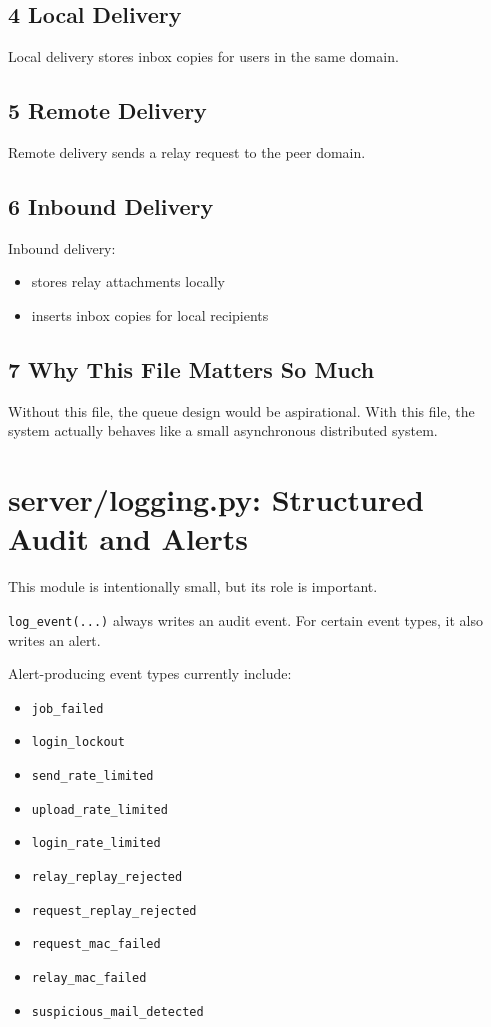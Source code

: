 \documentclass[11pt,a4paper]{article}
\begin{document}
\subsection{4 Local Delivery}

Local delivery stores inbox copies for users in the same domain.

\subsection{5 Remote Delivery}

Remote delivery sends a relay request to the peer domain.

\subsection{6 Inbound Delivery}

Inbound delivery:

\begin{itemize}
\item stores relay attachments locally
\item inserts inbox copies for local recipients
\end{itemize}

\subsection{7 Why This File Matters So Much}

Without this file, the queue design would be aspirational. With this file, the system actually behaves like a small asynchronous distributed system.


\section{server/logging.py: Structured Audit and Alerts}

This module is intentionally small, but its role is important.

\nolinkurl{log_event(...)} always writes an audit event. For certain event types, it also writes an alert.

Alert-producing event types currently include:

\begin{itemize}
\item \nolinkurl{job_failed}
\item \nolinkurl{login_lockout}
\item \nolinkurl{send_rate_limited}
\item \nolinkurl{upload_rate_limited}
\item \nolinkurl{login_rate_limited}
\item \nolinkurl{relay_replay_rejected}
\item \nolinkurl{request_replay_rejected}
\item \nolinkurl{request_mac_failed}
\item \nolinkurl{relay_mac_failed}
\item \nolinkurl{suspicious_mail_detected}
\end{itemize}
\end{document}
